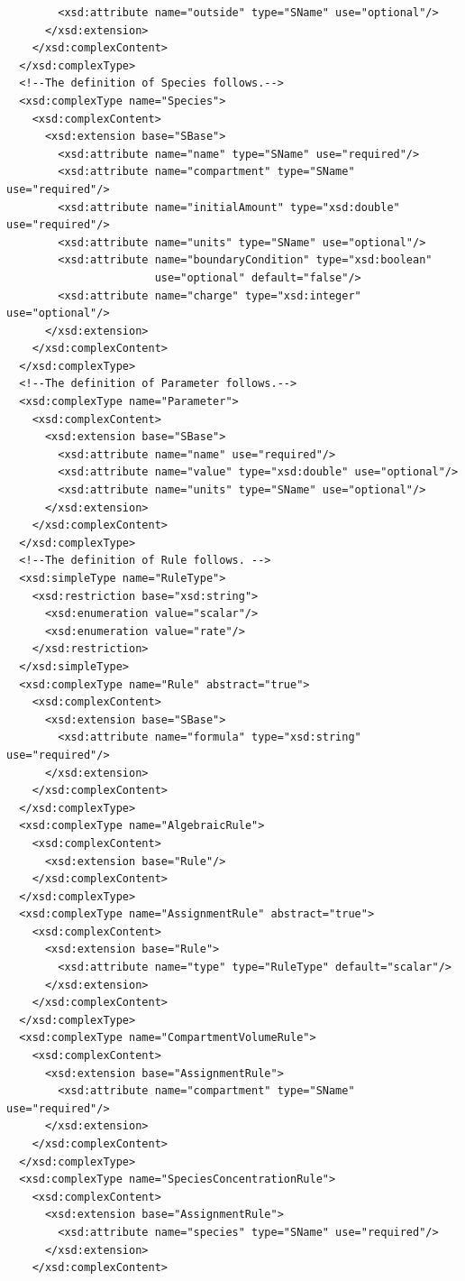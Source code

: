 \documentclass[10pt]{cekarticle}
\newenvironment{blockChanged}{\color{BrickRed}}{}
\begin{document}
\begin{blockChanged}
\begin{small}
\begin{verbatim}
      	<xsd:attribute name="outside" type="SName" use="optional"/>
      </xsd:extension>
    </xsd:complexContent>
  </xsd:complexType>
  <!--The definition of Species follows.-->
  <xsd:complexType name="Species">
    <xsd:complexContent>
      <xsd:extension base="SBase">
      	<xsd:attribute name="name" type="SName" use="required"/>
      	<xsd:attribute name="compartment" type="SName" use="required"/>
      	<xsd:attribute name="initialAmount" type="xsd:double" use="required"/>
      	<xsd:attribute name="units" type="SName" use="optional"/>
      	<xsd:attribute name="boundaryCondition" type="xsd:boolean"
                       use="optional" default="false"/>
      	<xsd:attribute name="charge" type="xsd:integer" use="optional"/>
      </xsd:extension>
    </xsd:complexContent>
  </xsd:complexType>
  <!--The definition of Parameter follows.-->
  <xsd:complexType name="Parameter">
    <xsd:complexContent>
      <xsd:extension base="SBase">
      	<xsd:attribute name="name" use="required"/>
      	<xsd:attribute name="value" type="xsd:double" use="optional"/>
      	<xsd:attribute name="units" type="SName" use="optional"/>
      </xsd:extension>
    </xsd:complexContent>
  </xsd:complexType>
  <!--The definition of Rule follows. -->
  <xsd:simpleType name="RuleType">
    <xsd:restriction base="xsd:string">
      <xsd:enumeration value="scalar"/>
      <xsd:enumeration value="rate"/>
    </xsd:restriction>
  </xsd:simpleType>
  <xsd:complexType name="Rule" abstract="true">
    <xsd:complexContent>
      <xsd:extension base="SBase">
      	<xsd:attribute name="formula" type="xsd:string" use="required"/>
      </xsd:extension>
    </xsd:complexContent>
  </xsd:complexType>
  <xsd:complexType name="AlgebraicRule">
    <xsd:complexContent>
      <xsd:extension base="Rule"/>
    </xsd:complexContent>
  </xsd:complexType>
  <xsd:complexType name="AssignmentRule" abstract="true">
    <xsd:complexContent>
      <xsd:extension base="Rule">
      	<xsd:attribute name="type" type="RuleType" default="scalar"/>
      </xsd:extension>
    </xsd:complexContent>
  </xsd:complexType>
  <xsd:complexType name="CompartmentVolumeRule">
    <xsd:complexContent>
      <xsd:extension base="AssignmentRule">
      	<xsd:attribute name="compartment" type="SName" use="required"/>
      </xsd:extension>
    </xsd:complexContent>
  </xsd:complexType>
  <xsd:complexType name="SpeciesConcentrationRule">
    <xsd:complexContent>
      <xsd:extension base="AssignmentRule">
      	<xsd:attribute name="species" type="SName" use="required"/>
      </xsd:extension>
    </xsd:complexContent>

\end{verbatim}
\end{small}
\end{blockChanged}
\end{document}
